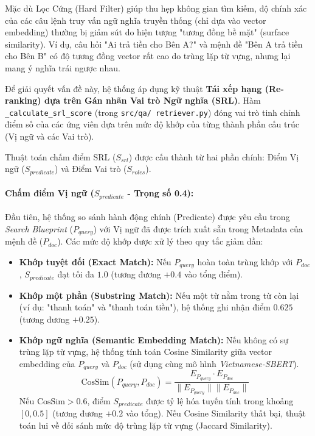 Mặc dù Lọc Cứng (Hard Filter) giúp thu hẹp không gian tìm kiếm, độ chính xác của các câu lệnh truy vấn ngữ nghĩa truyền thống (chỉ dựa vào vector embedding) thường bị giảm sút do hiện tượng "tương đồng bề mặt" (surface similarity). Ví dụ, câu hỏi "Ai trả tiền cho Bên A?" và mệnh đề "Bên A trả tiền cho Bên B" có độ tương đồng vector rất cao do trùng lặp từ vựng, nhưng lại mang ý nghĩa trái ngược nhau. 

Để giải quyết vấn đề này, hệ thống áp dụng kỹ thuật \textbf{Tái xếp hạng (Re-ranking) dựa trên Gán nhãn Vai trò Ngữ nghĩa (SRL)}. Hàm \texttt{\_calculate\_srl\_score} (trong \texttt{src/qa/ retriever.py}) đóng vai trò tinh chỉnh điểm số của các ứng viên dựa trên mức độ khớp của từng thành phần cấu trúc (Vị ngữ và các Vai trò).

Thuật toán chấm điểm SRL ($S_{srl}$) được cấu thành từ hai phần chính: Điểm Vị ngữ ($S_{predicate}$) và Điểm Vai trò ($S_{roles}$).

\paragraph{Chấm điểm Vị ngữ ($S_{predicate}$ - Trọng số 0.4):}
Đầu tiên, hệ thống so sánh hành động chính (Predicate) được yêu cầu trong \textit{Search Blueprint} ($P_{query}$) với Vị ngữ đã được trích xuất sẵn trong Metadata của mệnh đề ($P_{doc}$). Các mức độ khớp được xử lý theo quy tắc giảm dần:
\begin{itemize}
    \item \textbf{Khớp tuyệt đối (Exact Match):} Nếu $P_{query}$ hoàn toàn trùng khớp với $P_{doc}$, $S_{predicate}$ đạt tối đa $1.0$ (tương đương $+0.4$ vào tổng điểm).
    \item \textbf{Khớp một phần (Substring Match):} Nếu một từ nằm trong từ còn lại (ví dụ: "thanh toán" và "thanh toán tiền"), hệ thống ghi nhận điểm $0.625$ (tương đương $+0.25$).
    \item \textbf{Khớp ngữ nghĩa (Semantic Embedding Match):} Nếu không có sự trùng lặp từ vựng, hệ thống tính toán Cosine Similarity giữa vector embedding của $P_{query}$ và $P_{doc}$ (sử dụng cùng mô hình \textit{Vietnamese-SBERT}). 
    \begin{equation}
        \text{CosSim}(P_{query}, P_{doc}) = \frac{E_{P_{query}} \cdot E_{P_{doc}}}{\|E_{P_{query}}\| \|E_{P_{doc}}\|}
    \end{equation}
    Nếu $\text{CosSim} > 0.6$, điểm $S_{predicate}$ được tỷ lệ hóa tuyến tính trong khoảng $[0, 0.5]$ (tương đương $+0.2$ vào tổng). Nếu Cosine Similarity thất bại, thuật toán lui về đối sánh mức độ trùng lặp từ vựng (Jaccard Similarity).
\end{itemize}

